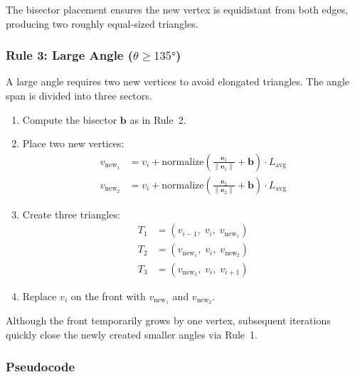 \documentclass[12pt,a4paper]{article}
\begin{document}
The bisector placement ensures the new vertex is equidistant from both edges, producing two roughly equal-sized triangles.

\subsubsection{Rule 3: Large Angle ($\theta \geq 135°$)}

A large angle requires two new vertices to avoid elongated triangles. The angle span is divided into three sectors.

\begin{enumerate}[leftmargin=2em]
  \item Compute the bisector $\mathbf{b}$ as in Rule~2.
  \item Place two new vertices:
    \begin{align}
      v_{\text{new}_1} &= v_i + \mathrm{normalize}\!\left(\frac{\mathbf{e}_1}{\|\mathbf{e}_1\|} + \mathbf{b}\right) \cdot L_{\text{avg}} \\[4pt]
      v_{\text{new}_2} &= v_i + \mathrm{normalize}\!\left(\frac{\mathbf{e}_2}{\|\mathbf{e}_2\|} + \mathbf{b}\right) \cdot L_{\text{avg}}
    \end{align}
  \item Create three triangles:
    \begin{align}
      T_1 &= (v_{i-1},\; v_i,\; v_{\text{new}_1}) \\
      T_2 &= (v_{\text{new}_1},\; v_i,\; v_{\text{new}_2}) \\
      T_3 &= (v_{\text{new}_2},\; v_i,\; v_{i+1})
    \end{align}
  \item Replace $v_i$ on the front with $v_{\text{new}_1}$ and $v_{\text{new}_2}$.
\end{enumerate}

Although the front temporarily grows by one vertex, subsequent iterations quickly close the newly created smaller angles via Rule~1.

\subsubsection{Pseudocode}
\end{document}
